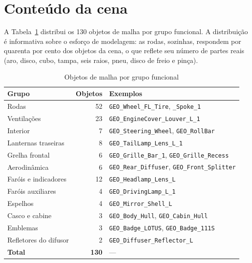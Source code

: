 \section{Conte\'udo da cena}

A Tabela~\ref{tab:grupos} distribui os 130 objetos de malha por grupo funcional. A
distribui{\c{c}}\~ao \'e informativa sobre o esfor{\c{c}}o de modelagem: as rodas, sozinhas,
respondem por quarenta por cento dos objetos da cena, o que reflete seu n\'umero de partes
reais (aro, disco, cubo, tampa, seis raios, pneu, disco de freio e pin{\c{c}}a).

\begin{table}[htbp]
\centering
\caption{Objetos de malha por grupo funcional}
\label{tab:grupos}
\footnotesize
\begin{tabular}{>{\raggedright\arraybackslash}p{6.2cm}r>{\raggedright\arraybackslash}p{5.4cm}}
\toprule
\textbf{Grupo} & \textbf{Objetos} & \textbf{Exemplos} \\
\midrule
Rodas & 52 & \texttt{GEO\_Wheel\_FL\_Tire}, \texttt{\_Spoke\_1} \\
Ventila{\c{c}}\~oes & 23 & \texttt{GEO\_EngineCover\_Louver\_L\_1} \\
Interior & 7 & \texttt{GEO\_Steering\_Wheel}, \texttt{GEO\_RollBar} \\
Lanternas traseiras & 8 & \texttt{GEO\_TailLamp\_Lens\_L\_1} \\
Grelha frontal & 6 & \texttt{GEO\_Grille\_Bar\_1}, \texttt{GEO\_Grille\_Recess} \\
Aerodin\^amica & 6 & \texttt{GEO\_Rear\_Diffuser}, \texttt{GEO\_Front\_Splitter} \\
Far\'ois e indicadores & 12 & \texttt{GEO\_Headlamp\_Lens\_L} \\
Far\'ois auxiliares & 4 & \texttt{GEO\_DrivingLamp\_L\_1} \\
Espelhos & 4 & \texttt{GEO\_Mirror\_Shell\_L} \\
Casco e cabine & 3 & \texttt{GEO\_Body\_Hull}, \texttt{GEO\_Cabin\_Hull} \\
Emblemas & 3 & \texttt{GEO\_Badge\_LOTUS}, \texttt{GEO\_Badge\_111S} \\
Refletores do difusor & 2 & \texttt{GEO\_Diffuser\_Reflector\_L} \\
\midrule
\textbf{Total} & \textbf{130} & --- \\
\bottomrule
\end{tabular}
\end{table}

